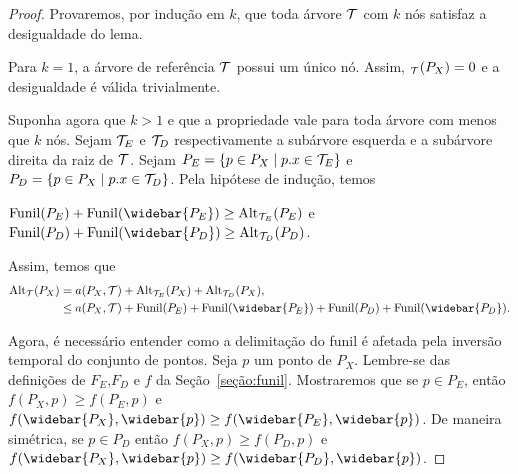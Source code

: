 \begin{proof}
    Provaremos, por indução em $k$, que toda árvore $\mathcal{T}$ com $k$ nós satisfaz a desigualdade do lema.

    Para $k = 1$, a árvore de referência $\mathcal{T}$ possui um único nó. Assim, \Alt$_{\mathcal{T}}(P_X) = 0$ e a desigualdade é válida trivialmente.

    Suponha agora que $k > 1$ e que a propriedade vale para toda árvore com menos que $k$ nós. Sejam $\mathcal{T}_{E}$ e $\mathcal{T}_{D}$ respectivamente a subárvore esquerda e a subárvore direita da raiz de $\mathcal{T}$. Sejam $P_E = \{p \in P_X \mid p.x \in \mathcal{T}_E\}$ e $P_D = \{p \in P_X \mid p.x \in \mathcal{T}_D\}$. Pela hipótese de indução, temos
    \begin{center}
    $\Funil(P_E) +  \Funil(\widebar{P_E}) \geq  \Alt_{\cT_E}(P_E)$ \mbox{e} $\Funil(P_D) +  \Funil(\widebar{P_D}) \geq  \Alt_{\cT_D}(P_D)$.
    \end{center}
    Assim, temos que
    \begin{align}
        \Alt_{\cT}(P_X) &= a(P_X,\cT) + \Alt_{\cT_E}(P_X) + \Alt_{\cT_D}(P_X), \notag \\
        &\leq a(P_X,\cT) + \Funil(P_E) +  \Funil(\widebar{P_E}) + \Funil(P_D) +  \Funil(\widebar{P_D}). \label{eq:inicio}
    \end{align}

    Agora, é necessário entender como a delimitação do funil é afetada pela inversão temporal do conjunto de pontos.
    Seja $p$ um ponto de $P_X$. Lembre-se das definições de $F_E$,$F_D$ e $f$ da Seção~\ref{seção:funil}.
    Mostraremos que se $p \in P_E$, então $f(P_X,p) \geq f(P_E,p)$ e $f(\widebar{P_X},\widebar{p}) \geq f(\widebar{P_E},\widebar{p})$. De maneira simétrica, se $p \in P_D$ então $f(P_X,p) \geq f(P_D,p)$ e $f(\widebar{P_X},\widebar{p}) \geq f(\widebar{P_D},\widebar{p})$.


\end{proof}
